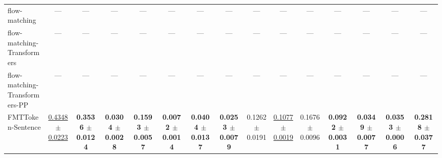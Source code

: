 \begin{table}[H]
{\begin{tabular}{lcccccccccccccc}
flow-matching & — & — & — & — & — & — & — & — & — & — & — & — & — & — \\
flow-matching-Transformers & — & — & — & — & — & — & — & — & — & — & — & — & — & — \\
flow-matching-Transformers-PP & — & — & — & — & — & — & — & — & — & — & — & — & — & — \\
FMTToken-Sentence & \underline{0.4348 $\pm$ 0.0223} & \textbf{0.3536 $\pm$ 0.0124} & \textbf{0.0304 $\pm$ 0.0028} & \textbf{0.1593 $\pm$ 0.0057} & \textbf{0.0072 $\pm$ 0.0014} & \textbf{0.0404 $\pm$ 0.0137} & \textbf{0.0253 $\pm$ 0.0079} & 0.1262 $\pm$ 0.0191 & \underline{0.1077 $\pm$ 0.0019} & 0.1676 $\pm$ 0.0096 & \textbf{0.0922 $\pm$ 0.0031} & \textbf{0.0349 $\pm$ 0.0077} & \textbf{0.0353 $\pm$ 0.0006} & \textbf{0.2818 $\pm$ 0.0377} \\
\bottomrule
\end{tabular}
}
\label{tab:dbpedia14}
\end{table}

